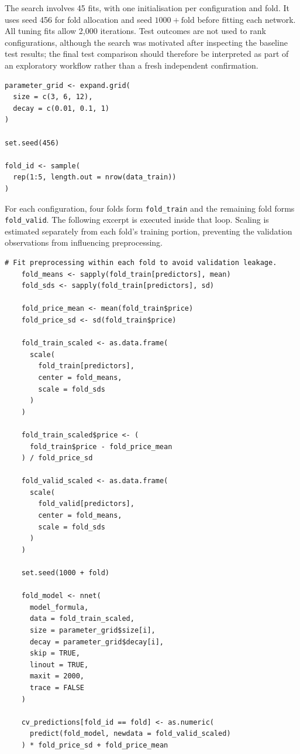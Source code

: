\documentclass[11pt,a4paper]{article}
\begin{document}
The search involves 45 fits, with one initialisation per configuration and fold. It uses seed 456 for fold allocation and seed $1000+\mathrm{fold}$ before fitting each network. All tuning fits allow 2,000 iterations. Test outcomes are not used to rank configurations, although the search was motivated after inspecting the baseline test results; the final test comparison should therefore be interpreted as part of an exploratory workflow rather than a fresh independent confirmation.
\begin{lstlisting}
parameter_grid <- expand.grid(
  size = c(3, 6, 12),
  decay = c(0.01, 0.1, 1)
)

set.seed(456)

fold_id <- sample(
  rep(1:5, length.out = nrow(data_train))
)
\end{lstlisting}
For each configuration, four folds form \texttt{fold\_train} and the remaining fold forms \texttt{fold\_valid}. The following excerpt is executed inside that loop. Scaling is estimated separately from each fold's training portion, preventing the validation observations from influencing preprocessing.
\begin{lstlisting}
# Fit preprocessing within each fold to avoid validation leakage.
    fold_means <- sapply(fold_train[predictors], mean)
    fold_sds <- sapply(fold_train[predictors], sd)

    fold_price_mean <- mean(fold_train$price)
    fold_price_sd <- sd(fold_train$price)

    fold_train_scaled <- as.data.frame(
      scale(
        fold_train[predictors],
        center = fold_means,
        scale = fold_sds
      )
    )

    fold_train_scaled$price <- (
      fold_train$price - fold_price_mean
    ) / fold_price_sd

    fold_valid_scaled <- as.data.frame(
      scale(
        fold_valid[predictors],
        center = fold_means,
        scale = fold_sds
      )
    )

    set.seed(1000 + fold)

    fold_model <- nnet(
      model_formula,
      data = fold_train_scaled,
      size = parameter_grid$size[i],
      decay = parameter_grid$decay[i],
      skip = TRUE,
      linout = TRUE,
      maxit = 2000,
      trace = FALSE
    )

    cv_predictions[fold_id == fold] <- as.numeric(
      predict(fold_model, newdata = fold_valid_scaled)
    ) * fold_price_sd + fold_price_mean
\end{lstlisting}
\end{document}
